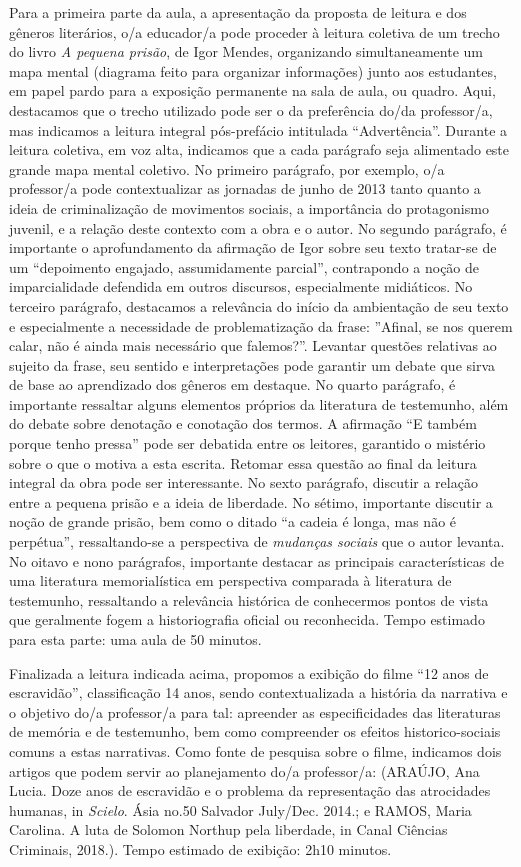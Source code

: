 \documentclass[11pt]{extarticle}
\begin{document}
Para a primeira parte da aula, a apresentação da proposta de leitura e
dos gêneros literários, o/a educador/a pode proceder à leitura coletiva
de um trecho do livro \emph{A pequena prisão}, de Igor Mendes,
organizando simultaneamente um mapa mental (diagrama feito para
organizar informações) junto aos estudantes, em papel pardo para a
exposição permanente na sala de aula, ou quadro. Aqui, destacamos que o
trecho utilizado pode ser o da preferência do/da professor/a, mas
indicamos a leitura integral pós-prefácio intitulada ``Advertência''.
Durante a leitura coletiva, em voz alta, indicamos que a cada parágrafo
seja alimentado este grande mapa mental coletivo. No primeiro parágrafo,
por exemplo, o/a professor/a pode contextualizar as jornadas de junho de
2013 tanto quanto a ideia de criminalização de movimentos sociais, a
importância do protagonismo juvenil, e a relação deste contexto com a
obra e o autor. No segundo parágrafo, é importante o aprofundamento da
afirmação de Igor sobre seu texto tratar-se de um ``depoimento engajado,
assumidamente parcial'', contrapondo a noção de imparcialidade defendida
em outros discursos, especialmente midiáticos. No terceiro parágrafo,
destacamos a relevância do início da ambientação de seu texto e
especialmente a necessidade de problematização da frase: ''Afinal, se
nos querem calar, não é ainda mais necessário que falemos?''. Levantar
questões relativas ao sujeito da frase, seu sentido e interpretações
pode garantir um debate que sirva de base ao aprendizado dos gêneros em
destaque. No quarto parágrafo, é importante ressaltar alguns elementos
próprios da literatura de testemunho, além do debate sobre denotação e
conotação dos termos. A afirmação ``E também porque tenho pressa'' pode
ser debatida entre os leitores, garantido o mistério sobre o que o
motiva a esta escrita. Retomar essa questão ao final da leitura integral
da obra pode ser interessante. No sexto parágrafo, discutir a relação
entre a pequena prisão e a ideia de liberdade. No sétimo, importante
discutir a noção de grande prisão, bem como o ditado ``a cadeia é longa,
mas não é perpétua'', ressaltando-se a perspectiva de \emph{mudanças
sociais} que o autor levanta. No oitavo e nono parágrafos, importante
destacar as principais características de uma literatura memorialística
em perspectiva comparada à literatura de testemunho, ressaltando a
relevância histórica de conhecermos pontos de vista que geralmente fogem
a historiografia oficial ou reconhecida. Tempo estimado para esta parte:
uma aula de 50 minutos.

Finalizada a leitura indicada acima, propomos a exibição do filme ``12
anos de escravidão'', classificação 14 anos, sendo contextualizada a
história da narrativa e o objetivo do/a professor/a para tal: apreender
as especificidades das literaturas de memória e de testemunho, bem como
compreender os efeitos historico-sociais comuns a estas narrativas. Como
fonte de pesquisa sobre o filme, indicamos dois artigos que podem servir
ao planejamento do/a professor/a: (ARAÚJO, Ana Lucia. Doze anos de
escravidão e o problema da representação das atrocidades humanas, in
\emph{Scielo}. Ásia no.50 Salvador July/Dec. 2014.; e RAMOS, Maria
Carolina. A luta de Solomon Northup pela liberdade, in Canal Ciências
Criminais, 2018.). Tempo estimado de exibição: 2h10 minutos.
\end{document}
